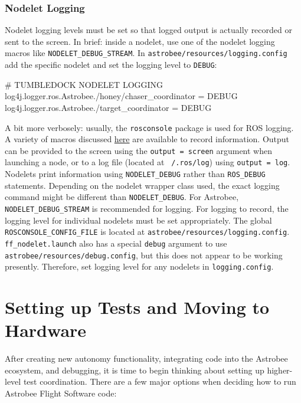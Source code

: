 \documentclass{article}
\begin{document}
\subsubsection{Nodelet Logging}

Nodelet logging levels must be set so that logged output is actually recorded or sent to the screen. In brief: inside a nodelet, use one of the nodelet logging macros like \texttt{NODELET\_DEBUG\_STREAM}. In \texttt{astrobee/resources/logging.config} add the specific nodelet and set the logging level to \texttt{DEBUG}:\begin{markdown}
	# TUMBLEDOCK NODELET LOGGING
	log4j.logger.ros.Astrobee./honey/chaser_coordinator    = DEBUG
	log4j.logger.ros.Astrobee./target_coordinator          = DEBUG
\end{markdown}
\vspace{0.5cm}

A bit more verbosely: usually, the \texttt{rosconsole} package is used for ROS logging. A variety of macros discussed \href{http://wiki.ros.org/roscpp/Overview/Logging}{here} are available to record information. Output can be provided to the screen using the \texttt{output = screen} argument when launching a node, or to a log file (located at \texttt{~/.ros/log}) using \texttt{output = log}. Nodelets print information using \texttt{NODELET\_DEBUG} rather than \texttt{ROS\_DEBUG} statements. Depending on the nodelet wrapper class used, the exact logging command might be different than \texttt{NODELET\_DEBUG}. For Astrobee, \texttt{NODELET\_DEBUG\_STREAM} is recommended for logging. For logging to record, the logging level for individual nodelets must be set appropriately. The global \texttt{ROSCONSOLE\_CONFIG\_FILE} is located at \texttt{astrobee/resources/logging.config}. \texttt{ff\_nodelet.launch} also has a special \texttt{debug} argument to use \\
\texttt{astrobee/resources/debug.config}, but this does not appear to be working presently. Therefore, set logging level for any nodelets in \texttt{logging.config}.

\clearpage
\section{Setting up Tests and Moving to Hardware}

After creating new autonomy functionality, integrating code into the Astrobee ecosystem, and debugging, it is time to begin thinking about setting up higher-level test coordination. There are a few major options when deciding how to run Astrobee Flight Software code:
\end{document}
